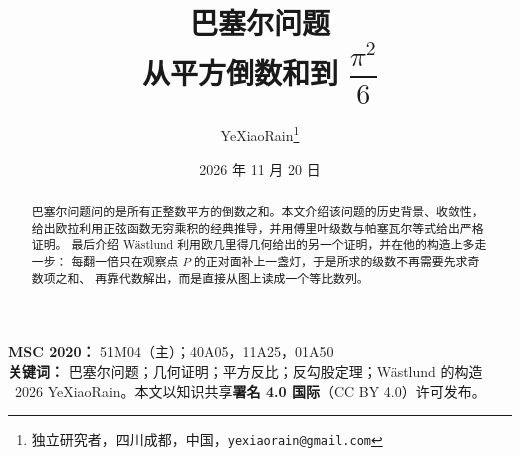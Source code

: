 \documentclass[11pt,a4paper]{article}
\title{\textbf{巴塞尔问题}\\[0.3em]
\large 从平方倒数和到 $\dfrac{\pi^2}{6}$}
\author{YeXiaoRain\thanks{独立研究者，四川成都，中国，\texttt{yexiaorain@gmail.com}}}
\date{2026 年 11 月 20 日}
\begin{document}
\maketitle

\begin{abstract}
巴塞尔问题问的是所有正整数平方的倒数之和。本文介绍该问题的历史背景、收敛性，
给出欧拉利用正弦函数无穷乘积的经典推导，并用傅里叶级数与帕塞瓦尔等式给出严格证明。
最后介绍 Wästlund 利用欧几里得几何给出的另一个证明，并在他的构造上多走一步：
每翻一倍只在观察点 $P$ 的正对面补上一盏灯，于是所求的级数不再需要先求奇数项之和、
再靠代数解出，而是直接从图上读成一个等比数列。
\end{abstract}

\begin{center}
\small
\textbf{MSC 2020：} 51M04（主）；40A05，11A25，01A50\\[0.3em]
\textbf{关键词：} 巴塞尔问题；几何证明；平方反比；反勾股定理；Wästlund 的构造\\[0.5em]
\textcopyright\ 2026 YeXiaoRain。本文以知识共享\textbf{署名 4.0 国际}（CC BY 4.0）许可发布。
\end{center}

\tableofcontents








\end{document}
